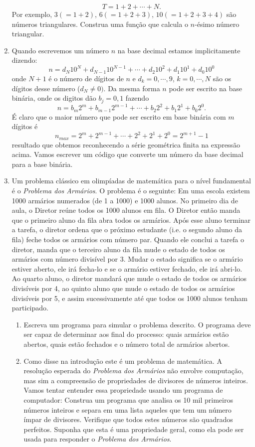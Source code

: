 \begin{enumerate}
    \[ T = 1+2+ \cdots+ N.\]
    Por exemplo, $3(=1+2)$, $6(=1+2+3)$, $10(=1+2+3+4)$ são números triangulares. Construa uma função que calcula o $n$-ésimo número triangular.
    \item  Quando escrevemos um número $n$ na base decimal estamos implicitamente dizendo:
\[ n = d_N 10^N + d_{N-1} 10^{N-1} + \cdots + d_2 10^2 + d_1 10^1 + d_0 10^0 \]
onde $N+1$ é o número de dígitos de $n$ e $d_k = 0,\cdots,9$, $k=0,\cdots,N$ são os dígitos desse número ($d_N \neq 0)$. Da mesma forma $n$ pode ser escrito na base binária, onde os digitos dão $b_j = 0,1 $ fazendo
\[ n = b_m 2^m + b_{m-1} 2^{m-1}+ \cdots + b_2 2^2 + b_1 2^1 + b_0 2^0. \]
É claro que o maior número que pode ser escrito em base binária com $m$ dígitos é
\[ n_{max} = 2^m + 2^{m-1}+ \cdots + 2^2 + 2^1 +  2^0 = 2^{m+1}-1 \]
resultado que obtemos reconhecendo a série geométrica finita na expressão acima. Vamos escrever um código que converte um número da base decimal para a base binária.
    \item Um problema clássico em olimpíadas de matemática para o nível fundamental é o {\it Problema dos Armários}. O problema é o seguinte: Em uma escola existem 1000 armários numerados (de 1 a 1000) e 1000 alunos. No primeiro dia de aula, o Diretor reúne todos os 1000 alunos em fila. O Diretor então manda que o primeiro aluno da fila abra todos os armários. Após esse aluno terminar a tarefa, o diretor ordena que o próximo estudante (i.e. o segundo aluno da fila) feche todos os armários com número par. Quando ele conclui a tarefa o diretor, manda que o terceiro aluno da fila mude o estado de todos os armários com número divisível por 3. Mudar o estado significa se o armário estiver aberto, ele irá fecha-lo e se o armário estiver fechado, ele irá abri-lo. Ao quarto aluno, o diretor mandará que mude o estado de todos os armários divisíveis por 4, ao quinto aluno que mude o estado de todos os armários divisíveis por 5, e assim sucessivamente até que todos os 1000 alunos tenham participado.
    \begin{enumerate}
        \item Escreva um programa para simular o problema descrito. O programa deve ser capaz de determinar aos final do processo: quais armários estão abertos, quais estão fechados e o número total de armários abertos.
        \item Como disse na introdução este é um problema de matemática. A resolução esperada do {\it Problema dos Armários} não envolve computação, mas sim a compreensão de propriedades de divisores de números inteiros. Vamos tentar entender essa propriedade usando um programa de computador: Construa um programa que analisa os 10 mil primeiros números inteiros e separa em uma lista aqueles que tem um número ímpar de divisores. Verifique que todos estes números são quadrados perfeitos. Suponha que esta é uma propriedade geral, como ela pode ser usada para responder o {\it Problema dos Armários}.

\end{enumerate}
\end{enumerate}

